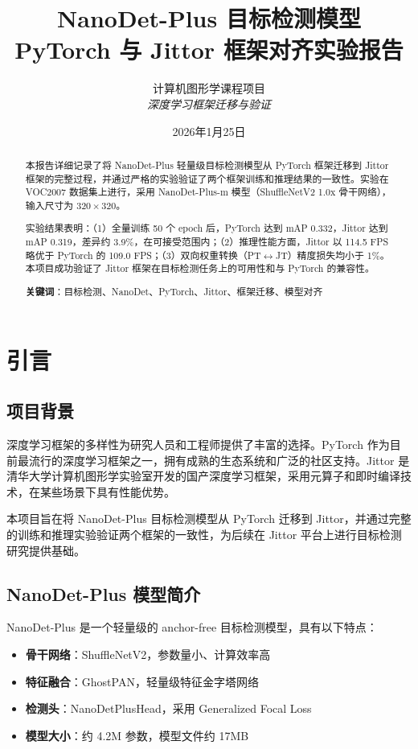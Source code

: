 \documentclass[12pt,a4paper]{article}
\title{
    \vspace{-2cm}
    \textbf{NanoDet-Plus 目标检测模型} \\
    \Large PyTorch 与 Jittor 框架对齐实验报告
}
\author{
    计算机图形学课程项目 \\
    \textit{深度学习框架迁移与验证}
}
\date{2026年1月25日}
\begin{document}
\maketitle

\begin{abstract}
本报告详细记录了将 NanoDet-Plus 轻量级目标检测模型从 PyTorch 框架迁移到 Jittor 框架的完整过程，并通过严格的实验验证了两个框架训练和推理结果的一致性。实验在 VOC2007 数据集上进行，采用 NanoDet-Plus-m 模型（ShuffleNetV2 1.0x 骨干网络），输入尺寸为 $320 \times 320$。

实验结果表明：（1）全量训练 50 个 epoch 后，PyTorch 达到 mAP 0.332，Jittor 达到 mAP 0.319，差异约 3.9\%，在可接受范围内；（2）推理性能方面，Jittor 以 114.5 FPS 略优于 PyTorch 的 109.0 FPS；（3）双向权重转换（PT$\leftrightarrow$JT）精度损失均小于 1\%。本项目成功验证了 Jittor 框架在目标检测任务上的可用性和与 PyTorch 的兼容性。

\textbf{关键词}：目标检测、NanoDet、PyTorch、Jittor、框架迁移、模型对齐
\end{abstract}

\newpage
\tableofcontents
\newpage

\section{引言}

\subsection{项目背景}

深度学习框架的多样性为研究人员和工程师提供了丰富的选择。PyTorch 作为目前最流行的深度学习框架之一，拥有成熟的生态系统和广泛的社区支持。Jittor 是清华大学计算机图形学实验室开发的国产深度学习框架，采用元算子和即时编译技术，在某些场景下具有性能优势。

本项目旨在将 NanoDet-Plus 目标检测模型从 PyTorch 迁移到 Jittor，并通过完整的训练和推理实验验证两个框架的一致性，为后续在 Jittor 平台上进行目标检测研究提供基础。

\subsection{NanoDet-Plus 模型简介}

NanoDet-Plus 是一个轻量级的 anchor-free 目标检测模型，具有以下特点：
\begin{itemize}
    \item \textbf{骨干网络}：ShuffleNetV2，参数量小、计算效率高
    \item \textbf{特征融合}：GhostPAN，轻量级特征金字塔网络
    \item \textbf{检测头}：NanoDetPlusHead，采用 Generalized Focal Loss
    \item \textbf{模型大小}：约 4.2M 参数，模型文件约 17MB
\end{itemize}
\end{document}
